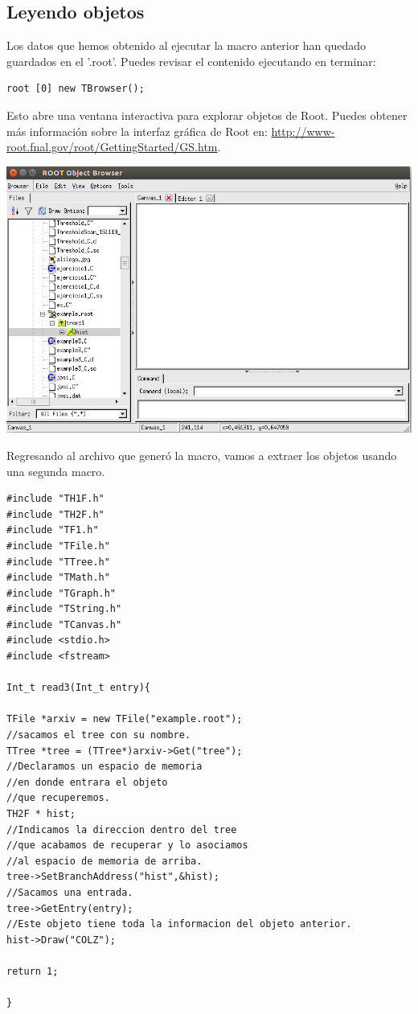 \documentclass{article}
\begin{document}
\subsection{Leyendo objetos}

Los datos que hemos obtenido al ejecutar la macro anterior han quedado guardados en el '.root'. Puedes revisar el contenido ejecutando en terminar:
\begin{tcolorbox} [breakable]
\begin{verbatim}
root [0] new TBrowser();
\end{verbatim}
\end{tcolorbox}
Esto abre una ventana interactiva para explorar objetos de Root. Puedes obtener m\'as informaci\'on sobre la interfaz gr\'afica de Root en: \url{http://www-root.fnal.gov/root/GettingStarted/GS.htm}.
\begin{center}
\includegraphics[scale=0.4]{browser.png}
\end{center}
\par
Regresando al archivo que gener\'o la macro, vamos a extraer los objetos usando una segunda macro.

\begin{tcolorbox} [breakable]
\begin{verbatim}
#include "TH1F.h"
#include "TH2F.h"
#include "TF1.h"
#include "TFile.h"
#include "TTree.h"
#include "TMath.h"
#include "TGraph.h"
#include "TString.h"
#include "TCanvas.h"
#include <stdio.h>
#include <fstream>

Int_t read3(Int_t entry){

TFile *arxiv = new TFile("example.root");
//sacamos el tree con su nombre.
TTree *tree = (TTree*)arxiv->Get("tree");
//Declaramos un espacio de memoria
//en donde entrara el objeto
//que recuperemos.
TH2F * hist;
//Indicamos la direccion dentro del tree
//que acabamos de recuperar y lo asociamos
//al espacio de memoria de arriba.
tree->SetBranchAddress("hist",&hist);
//Sacamos una entrada.
tree->GetEntry(entry);
//Este objeto tiene toda la informacion del objeto anterior.
hist->Draw("COLZ");

return 1;

}
\end{verbatim}
\end{tcolorbox}
\end{document}
